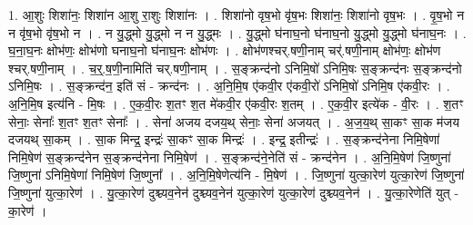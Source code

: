 \documentclass[17pt]{extarticle}
\begin{document}
1. आ॒शुः शिशा॑नः॒ शिशा॑न आ॒शु रा॒शुः शिशा॑नः । . शिशा॑नो वृष॒भो वृ॑ष॒भः शिशा॑नः॒ शिशा॑नो वृष॒भः । . वृ॒ष॒भो न न वृ॑ष॒भो वृ॑ष॒भो न । . न यु॒द्ध्मो यु॒द्ध्मो न न यु॒द्ध्मः । . यु॒द्ध्मो घ॑नाघ॒नो घ॑नाघ॒नो यु॒द्ध्मो यु॒द्ध्मो घ॑नाघ॒नः । . घ॒ना॒घ॒नः क्षोभ॑णः॒ क्षोभ॑णो घनाघ॒नो घ॑नाघ॒नः क्षोभ॑णः । . क्षोभ॑णश्चर्.षणी॒नाम् चर्॑.षणी॒नाम् क्षोभ॑णः॒ क्षोभ॑ण श्चर्.षणी॒नाम् । . च॒र्॒.ष॒णी॒नामिति॑ चर्.षणी॒नाम् । . स॒ङ्क्रन्द॑नो ऽनिमि॒षो॑ ऽनिमि॒षः स॒ङ्क्रन्द॑नः स॒ङ्क्रन्द॑नो ऽनिमि॒षः । . स॒ङ्क्रन्द॑न॒ इति॑ सं - क्रन्द॑नः । . अ॒नि॒मि॒ष ए॑कवी॒र ए॑कवी॒रो॑ ऽनिमि॒षो॑ ऽनिमि॒ष ए॑कवी॒रः । . अ॒नि॒मि॒ष इत्य॑नि - मि॒षः । . ए॒क॒वी॒रः श॒तꣳ श॒त मे॑कवी॒र ए॑कवी॒रः श॒तम् । . ए॒क॒वी॒र इत्ये॑क - वी॒रः । . श॒तꣳ सेनाः॒ सेनाः᳚ श॒तꣳ श॒तꣳ सेनाः᳚ । . सेना॑ अजय दजय॒थ् सेनाः॒ सेना॑ अजयत् । . अ॒ज॒य॒थ् सा॒कꣳ सा॒क म॑जय दजयथ् सा॒कम् । . सा॒क मिन्द्र॒ इन्द्रः॑ सा॒कꣳ सा॒क मिन्द्रः॑ । . इन्द्र॒ इतीन्द्रः॑ । . स॒ङ्क्रन्द॑नेना निमि॒षेणा॑ निमि॒षेण॑ स॒ङ्क्रन्द॑नेन स॒ङ्क्रन्द॑नेना निमि॒षेण॑ । . स॒ङ्क्रन्द॑ने॒नेति॑ सं - क्रन्द॑नेन । . अ॒नि॒मि॒षेण॑ जि॒ष्णुना॑ जि॒ष्णुना॑ ऽनिमि॒षेणा॑ निमि॒षेण॑ जि॒ष्णुना᳚ । . अ॒नि॒मि॒षेणेत्य॑नि - मि॒षेण॑ । . जि॒ष्णुना॑ युत्का॒रेण॑ युत्का॒रेण॑ जि॒ष्णुना॑ जि॒ष्णुना॑ युत्का॒रेण॑ । . यु॒त्का॒रेण॑ दुश्च्यव॒नेन॑ दुश्च्यव॒नेन॑ युत्का॒रेण॑ युत्का॒रेण॑ दुश्च्यव॒नेन॑ । . यु॒त्का॒रेणेति॑ युत् - का॒रेण॑ । \newline
\end{document}
